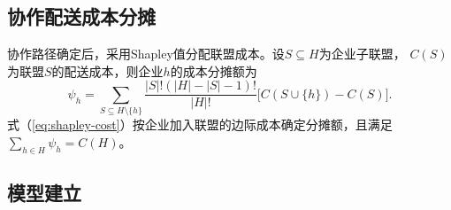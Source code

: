 \subsection{协作配送成本分摊}
\label{sec:allocation-model}

协作路径确定后，采用Shapley值分配联盟成本\cite{ref:91}。设$S\subseteq H$为企业子联盟，
$C(S)$为联盟$S$的配送成本，则企业$h$的成本分摊额为
\begin{equation}
\psi_h=\sum_{S\subseteq H\setminus\{h\}}
\frac{|S|!(|H|-|S|-1)!}{|H|!}
\bigl[C(S\cup\{h\})-C(S)\bigr].
\label{eq:shapley-cost}
\end{equation}
式（\ref{eq:shapley-cost}）按企业加入联盟的边际成本确定分摊额，且满足
$\sum_{h\in H}\psi_h=C(H)$。

\subsection{模型建立}

